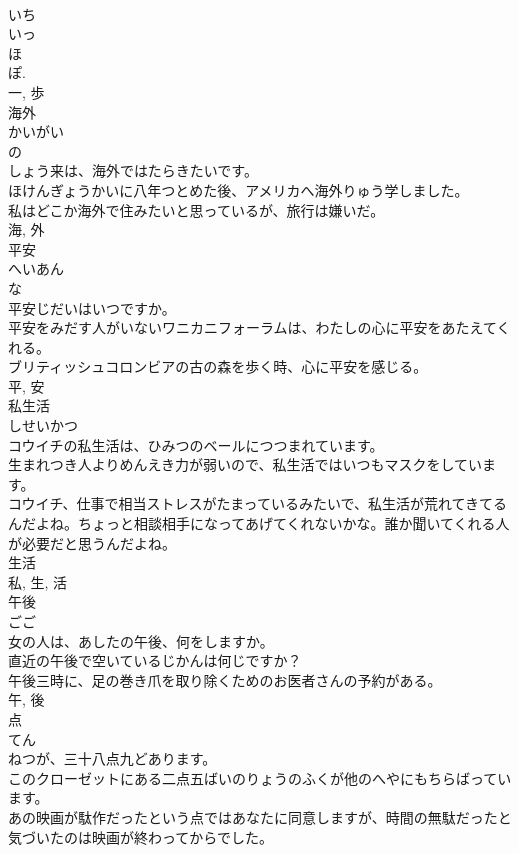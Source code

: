 \documentclass[8pt]{extreport}
\begin{document}
\begin{CJK}{UTF8}{min}
\\	いち 
\\	いっ 
\\	ほ 
\\	ぽ. 
\\	一, 歩	
\\	海外	
\\	かいがい	
\\	の 
\\	しょう来は、海外ではたらきたいです。	
\\	ほけんぎょうかいに八年つとめた後、アメリカへ海外りゅう学しました。	
\\	私はどこか海外で住みたいと思っているが、旅行は嫌いだ。	
\\	海, 外	
\\	平安	
\\	へいあん	
\\	な 
\\	平安じだいはいつですか。	
\\	平安をみだす人がいないワニカニフォーラムは、わたしの心に平安をあたえてくれる。	
\\	ブリティッシュコロンビアの古の森を歩く時、心に平安を感じる。	
\\	平, 安	
\\	私生活	
\\	しせいかつ	
\\	コウイチの私生活は、ひみつのベールにつつまれています。	
\\	生まれつき人よりめんえき力が弱いので、私生活ではいつもマスクをしています。	
\\	コウイチ、仕事で相当ストレスがたまっているみたいで、私生活が荒れてきてるんだよね。ちょっと相談相手になってあげてくれないかな。誰か聞いてくれる人が必要だと思うんだよね。	
\\	生活 
\\	私, 生, 活	
\\	午後	
\\	ごご	
\\	女の人は、あしたの午後、何をしますか。	
\\	直近の午後で空いているじかんは何じですか？	
\\	午後三時に、足の巻き爪を取り除くためのお医者さんの予約がある。	
\\	午, 後	
\\	点	
\\	てん	
\\	ねつが、三十八点九どあります。	
\\	このクローゼットにある二点五ばいのりょうのふくが他のへやにもちらばっています。	
\\	あの映画が駄作だったという点ではあなたに同意しますが、時間の無駄だったと気づいたのは映画が終わってからでした。	

\end{CJK}
\end{document}
